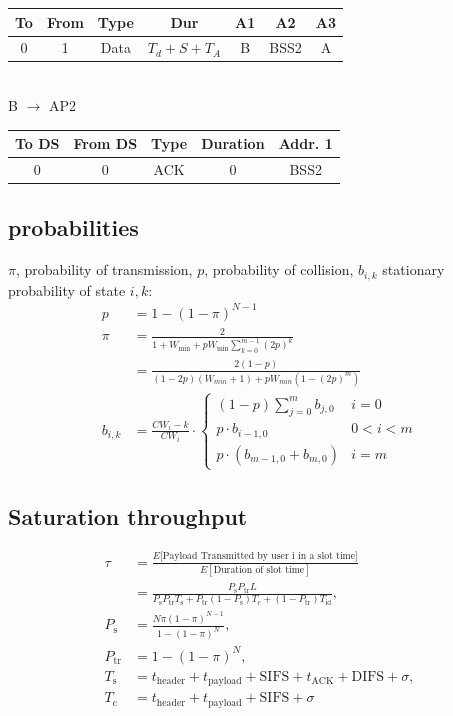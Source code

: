 \documentclass[6pt]{scrartcl}
\begin{document}
\begin{multicols}{4}
\begin{tabular}{|c|c|c|c|c|c|c|}
  \hline
  To & From & Type & Dur & A1 & A2 & A3 \\
  \hline
  0 & 1 & Data & $T_{d} + S + T_{A}$ & B & BSS2 & A \\
  \hline
\end{tabular}\\
B $\rightarrow$ AP2\\
\begin{tabular}{|c|c|c|c|c|}
  \hline
  To DS & From DS & Type & Duration & Addr. 1 \\
  \hline
  0 & 0 & ACK & 0 & BSS2 \\
  \hline
\end{tabular}





\subsection{probabilities}
$\pi$, probability of transmission, $p$, probability of collision,
$b_{i,k}$ stationary probability of state $i,k$:
\begin{align*}
p &= 1-(1-\pi)^{N-1} \\
\pi &= \frac{2}{ 1 + W_\textrm{min} + pW_\textrm{min}\sum^{m-1}_{k=0}(2p)^k}\\
	 &= \frac{2(1-p)}{(1-2p)(W_{min} + 1)+pW_{min}(1-(2p)^m)}\\
b_{i,k} &= \frac{CW_i - k}{CW_i} \cdot \left \{ \begin{array}{ll}
    (1-p) \sum_{j=0}^m b_{j,0} & i = 0\\
    p \cdot b_{i-1,0} & 0 < i < m\\
    p \cdot (b_{m-1,0} + b_{m,0}) & i = m
    \end{array} \right.
\end{align*}

\subsection{Saturation throughput}

\begin{align*}
 \tau &= \frac{E\lbrack\textrm{Payload Transmitted by user i in a slot time}\rbrack}{E[\textrm{Duration of slot time}]} \\ 
 &= \frac{P_\textrm{s}P_{\textrm{tr}}L}{P_\textrm{s}P_{\textrm{tr}}T_{\textrm{s}} + P_\textrm{tr}(1-P_\textrm{s})T_\textrm{c} + (1-P_\textrm{tr})T_\textrm{id}}, \\
 P_\textrm{s} &= \frac{N\pi (1-\pi)^{N-1}}{1-(1-\pi)^N}, \\
 P_\textrm{tr} &= 1-(1-\pi)^N, \\
 T_\textrm{s} &= t_\textrm{header} + t_\textrm{payload} + \textrm{SIFS} + t_\textrm{ACK} + \textrm{DIFS} + \sigma,\\
 T_\textrm{c} &= t_\textrm{header} + t_\textrm{payload} + \textrm{SIFS} + \sigma
\end{align*}


\end{multicols}
\end{document}
